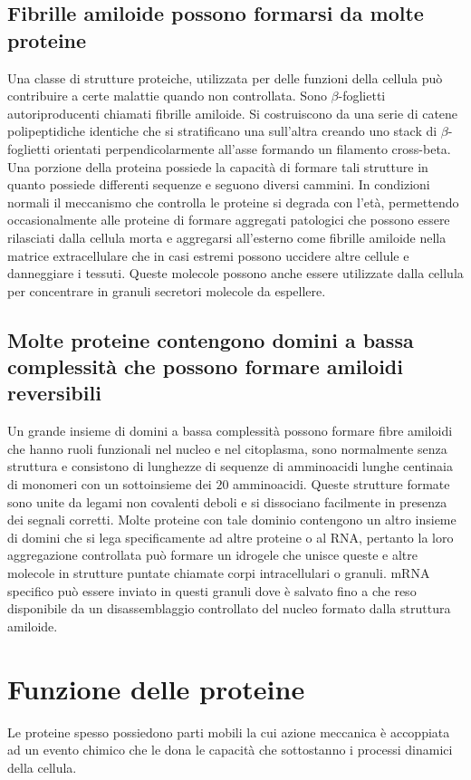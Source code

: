 \subsection{Fibrille amiloide possono formarsi da molte proteine}
Una classe di strutture proteiche, utilizzata per delle funzioni della cellula pu\`o contribuire a certe malattie quando non controllata. Sono $\beta$-foglietti autoriproducenti chiamati
fibrille amiloide. Si costruiscono da una serie di catene polipeptidiche identiche che si stratificano una sull'altra creando uno stack di $\beta$-foglietti orientati perpendicolarmente
all'asse formando un filamento cross-beta. Una porzione della proteina possiede la capacit\`a di formare tali strutture in quanto possiede differenti sequenze e seguono diversi cammini. 
In condizioni normali il meccanismo che controlla le proteine si degrada con l'et\`a, permettendo occasionalmente alle proteine di formare aggregati patologici che possono essere 
rilasciati dalla cellula morta e aggregarsi all'esterno come fibrille amiloide nella matrice extracellulare che in casi estremi possono uccidere altre cellule e danneggiare i tessuti.
Queste molecole possono anche essere utilizzate dalla cellula per concentrare in granuli secretori molecole da espellere. 
\subsection{Molte proteine contengono domini a bassa complessit\`a che possono formare amiloidi reversibili}
Un grande insieme di domini a bassa complessit\`a possono formare fibre amiloidi che hanno ruoli funzionali nel nucleo e nel citoplasma, sono normalmente senza struttura e consistono
di lunghezze di sequenze di amminoacidi lunghe centinaia di monomeri con un sottoinsieme dei $20$ amminoacidi. Queste strutture formate sono unite da legami non covalenti deboli e si
dissociano facilmente in presenza dei segnali corretti. Molte proteine con tale dominio contengono un altro insieme di domini che si lega specificamente ad altre proteine o al RNA, 
pertanto la loro aggregazione controllata pu\`o formare un idrogele che unisce queste e altre molecole in strutture puntate chiamate corpi intracellulari o granuli. mRNA specifico pu\`o
essere inviato in questi granuli dove \`e salvato fino a che reso disponibile da un disassemblaggio controllato del nucleo formato dalla struttura amiloide. 
\section{Funzione delle proteine}
Le proteine spesso possiedono parti mobili la cui azione meccanica \`e accoppiata ad un evento chimico che le dona le capacit\`a che sottostanno i processi dinamici della cellula. 
